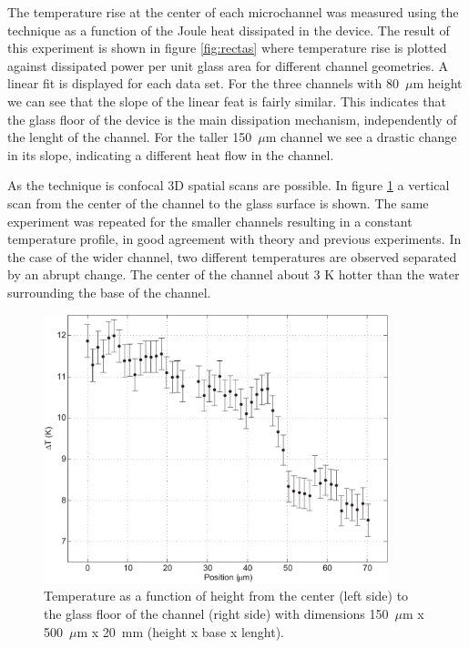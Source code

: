 \documentclass[]{spie}  %
\newcommand{\figsimple}{10cm} %
\begin{document}
The temperature rise at the center of each microchannel was measured using the technique as a function of the Joule heat dissipated in the device. The result of this experiment is shown in figure \ref{fig:rectas} where temperature rise is plotted against dissipated power per unit glass area for different channel geometries. A linear fit is displayed for each data set. For the three channels with 80~$\mu$m height we can see that the slope of the linear feat is fairly similar. This indicates that the glass floor of the device is the main dissipation mechanism, independently of the lenght of the channel. For the taller 150~$\mu$m channel we see a drastic change in its slope, indicating a different heat flow in the channel.  

As the technique is confocal 3D spatial scans are possible. In figure \ref{fig:vertical} a vertical scan from the center of the channel to the glass surface is shown. The same experiment was repeated for the smaller channels resulting in a constant temperature profile, in good agreement with theory and previous experiments. In the case of the wider channel, two different temperatures are observed separated by an abrupt change. The center of the channel about 3 K hotter than the water surrounding the base of the channel. 

\begin{figure}[h!]
\centering
\includegraphics[width=\figsimple]{figs/vertical_raro.pdf}
\caption{Temperature as a function of height from the center (left side) to the glass floor of the channel (right side) with dimensions 150~$\mu$m x 500~$\mu$m x 20~mm (height x base x lenght).\label{fig:vertical}}
\end{figure}
\end{document}
